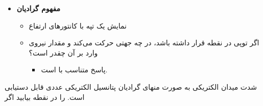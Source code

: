 \begin{ELunit}

\begin{itemize}
\tightlist
\item
  \textbf{مفهوم گرادیان}

  \begin{itemize}
  \tightlist
  \item
    نمایش یک تپه با کانتورهای ارتفاع \ELim{\ELto} 
  \item
    اگر توپی در نقطه  قرار داشته باشد، در چه جهتی حرکت می‌کند و مقدار نیروی وارد بر آن چقدر است؟

    \begin{itemize}
    \tightlist
    \item
      پاسخ متناسب با  است.
    \end{itemize}
  \end{itemize}
\end{itemize}


\end{ELunit}


\begin{ELexample}{}

شدت میدان الکتریکی  به صورت منهای گرادیان پتانسیل الکتریکی عددی  قابل دستیابی است.  را در نقطه  بیابید اگر

\begin{ELsolution}


\end{ELsolution}

\end{ELexample}

\ELhold


